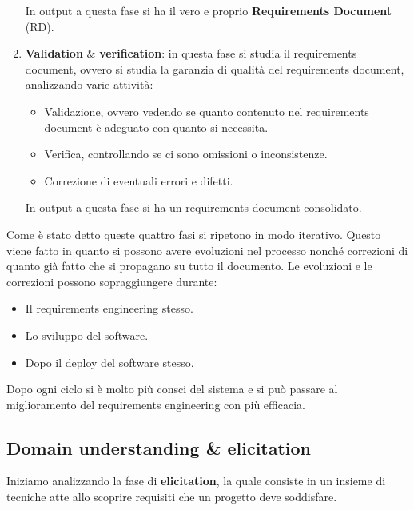 \begin{enumerate}
\begin{itemize}
            \end{itemize}
            In output a questa fase si ha il vero e proprio \textbf{Requirements
                  Document} (RD).
      \item \textbf{Validation} $\&$ \textbf{verification}: in questa fase si
            studia il requirements document, ovvero si studia la garanzia di
            qualità del requirements document, analizzando varie attività:
            \begin{itemize}
                  \item Validazione, ovvero vedendo se quanto contenuto nel
                        requirements document è adeguato con quanto si necessita.
                  \item Verifica, controllando se ci sono omissioni o
                        inconsistenze.
                  \item Correzione di eventuali errori e difetti.
            \end{itemize}
            In output a questa fase si ha un requirements document consolidato.
\end{enumerate}
Come è stato detto queste quattro fasi si ripetono in modo iterativo. Questo
viene fatto in quanto si possono avere evoluzioni nel processo nonché correzioni
di quanto già fatto che si propagano su tutto il documento. Le evoluzioni e le
correzioni possono sopraggiungere durante:
\begin{itemize}
      \item Il requirements engineering stesso.
      \item Lo sviluppo del software.
      \item Dopo il deploy del software stesso.
\end{itemize}
Dopo ogni ciclo si è molto più consci del sistema e si può passare al miglioramento
del requirements engineering con più efficacia.
\subsection{Domain understanding \& elicitation}
Iniziamo analizzando la fase di \textbf{elicitation}, la quale consiste in un
insieme di tecniche atte allo scoprire requisiti che un progetto deve soddisfare.
